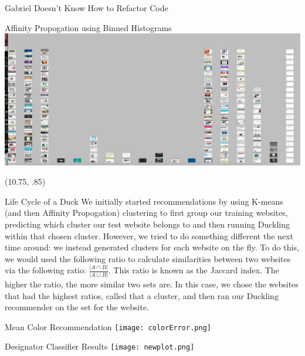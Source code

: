 \documentclass{beamer}
\begin{document}
\begin{frame}{\centerline{\Huge Gabriel Doesn't Know How to Refactor Code}}
\begin{textblock}{5}
\begin{block}{Affinity Propogation using Binned Histograms}
\includegraphics[scale=.5]{binAffProp.jpg}
\end{block}
\end{textblock}

\begin{textblock}{5}(10.75, .85)
\begin{block}{Life Cycle of a Duck}
We initially started recommendations by using K-means (and then Affinity Propogation) clustering to first group our training websites, predicting which cluster our test website belongs to and then running Duckling within that chosen cluster. However, we tried to do something different the next time around: we instead generated clusters for each website on the fly. To do this, we would used the following ratio to calculate similarities between two websites via the following ratio: $\frac{|A \cap B|}{|A \cup B|}$. This ratio is known as the Jaccard index. The higher the ratio, the more similar two sets are. In this case, we chose the websites that had the highest ratios, called that a cluster, and then ran our Duckling recommender on the set for the website.
\end{block}
\begin{block}{Mean Color Recommendation}
\texttt{[image: colorError.png]}
\end{block}
\begin{block}{Designator Classifier Results}
\texttt{[image: newplot.png]}
\end{block}
\end{textblock}
\end{frame}
\end{document}
